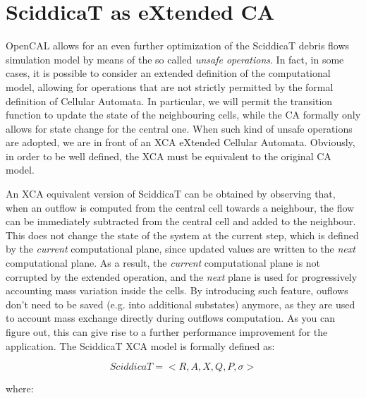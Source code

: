 \section{SciddicaT as eXtended CA}\label{sec:sciddicaT_extended}
OpenCAL allows for an even further optimization of the SciddicaT debris flows
simulation model by means of the so called \emph{unsafe
  operations}. In fact, in some cases, it is possible to consider an
extended definition of the computational model, allowing for
operations that are not strictly permitted by the formal definition of
Cellular Automata. In particular, we will permit the transition
function to update the state of the neighbouring cells, while the CA
formally only allows for state change for the central one. When
such kind of unsafe operations are adopted, we are in front of an XCA eXtended
Cellular Automata. Obviously, in order to be well defined, the XCA
must be equivalent to the original CA model.

An XCA equivalent version of SciddicaT can be obtained by observing
that, when an outflow is computed from the central cell towards a
neighbour, the flow can be immediately subtracted from the central cell
and added to the neighbour. This does not change the state of the
system at the current step, which is defined by the \emph{current}
computational plane, since updated values are written to the
\emph{next} computational plane. As a result, the \emph{current}
computational plane is not corrupted by the extended operation, and
the \emph{next} plane is used for progressively accounting mass
variation inside the cells. By introducing such feature, ouflows don't
need to be saved (e.g. into additional substates) anymore, as they are
used to account mass exchange directly during outflows computation. As
you can figure out, this can give rise to a further performance
improvement for the application. The SciddicaT XCA model is formally
defined as:


$$SciddicaT = < R, A, X, Q , P, \sigma  >$$

where:


